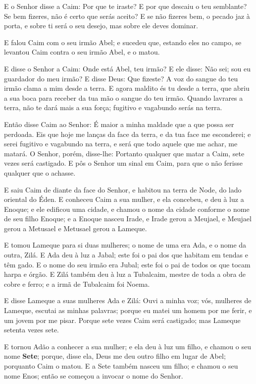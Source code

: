 E o Senhor disse a Caim: Por que te iraste? E por que descaiu o
teu semblante? Se bem fizeres, não é certo que serás aceito? E
se não fizeres bem, o pecado jaz à porta, e sobre ti será o seu
desejo, mas sobre ele deves dominar.

E falou Caim com o seu irmão Abel; e sucedeu que, estando eles no
campo, se levantou Caim contra o seu irmão Abel, e o matou.

E disse o Senhor a Caim: Onde está Abel, teu irmão? E ele disse:
Não sei; sou eu guardador do meu irmão? E disse Deus: Que
fizeste? A voz do sangue do teu irmão clama a mim desde a terra.
E agora maldito és tu desde a terra, que abriu a sua boca
para receber da tua mão o sangue do teu irmão. Quando
lavrares a terra, não te dará mais a sua força; fugitivo e vagabundo
serás na terra.

Então disse Caim ao Senhor: É maior a minha maldade que a que
possa ser perdoada. Eis que hoje me lanças da face da terra,
e da tua face me esconderei; e serei fugitivo e vagabundo na terra,
e será que todo aquele que me achar, me matará. O Senhor,
porém, disse-lhe: Portanto qualquer que matar a Caim, sete vezes
será castigado. E pôs o Senhor um sinal em Caim, para que o não
ferisse qualquer que o achasse.

E saiu Caim de diante da face do Senhor, e habitou na terra de
Node, do lado oriental do Éden. E conheceu Caim a sua mulher,
e ela concebeu, e deu à luz a Enoque; e ele edificou uma cidade, e
chamou o nome da cidade conforme o nome de seu filho Enoque;
e a Enoque nasceu Irade, e Irade gerou a Meujael, e Meujael
gerou a Metusael e Metusael gerou a Lameque.

E tomou Lameque para si duas mulheres; o nome de uma era Ada, e o
nome da outra, Zilá. E Ada deu à luz a Jabal; este foi o pai
dos que habitam em tendas e têm gado. E o nome do seu irmão
era Jubal; este foi o pai de todos os que tocam harpa e órgão.
E Zilá também deu à luz a Tubalcaim, mestre de toda a obra de
cobre e ferro; e a irmã de Tubalcaim foi Noema.

E disse Lameque a suas mulheres Ada e Zilá: Ouvi a minha voz;
vós, mulheres de Lameque, escutai as minhas palavras; porque eu
matei um homem por me ferir, e um jovem por me pisar. Porque
sete vezes Caim será castigado; mas Lameque setenta vezes sete.

E tornou Adão a conhecer a sua mulher; e ela deu à luz um filho,
e chamou o seu nome \textbf{Sete}; porque, disse ela, Deus me deu
outro filho em lugar de Abel; porquanto Caim o matou. E a
Sete também nasceu um filho; e chamou o seu nome Enos; então se
começou a invocar o nome do Senhor.

